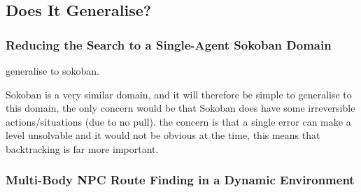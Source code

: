 \documentclass[letterpaper]{article}
\begin{document}
			

	\subsection{Does It Generalise?}
		
		\subsubsection{Reducing the Search to a Single-Agent Sokoban Domain}
			generalise to sokoban.
			
			Sokoban is a very similar domain, and it will therefore be simple to generalise to this domain, the only concern would be that Sokoban does have some irreversible actions/situations (due to no pull). the concern is that a single error can make a level unsolvable and it would not be obvious at the time, this means that backtracking is far more important.

		\subsubsection{Multi-Body NPC Route Finding in a Dynamic Environment}



\end{document}
